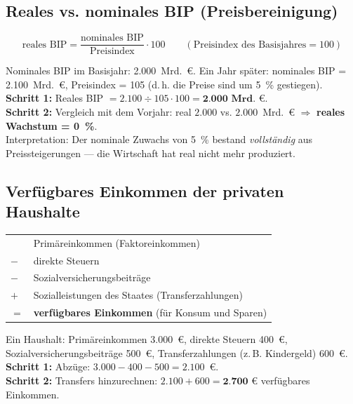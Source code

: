 \documentclass[11pt, a4paper]{article}
\begin{document}
\subsection{Reales vs. nominales BIP (Preisbereinigung)}

\begin{merksatz}[title={\bfseries Formel: reales BIP}]
\[
\text{reales BIP} = \frac{\text{nominales BIP}}{\text{Preisindex}} \cdot 100
\qquad (\text{Preisindex des Basisjahres} = 100)
\]
\end{merksatz}

\begin{beispiel}
Nominales BIP im Basisjahr: 2.000~Mrd.~€. Ein Jahr später: nominales BIP =
2.100~Mrd.~€, Preisindex = 105 (d.\,h. die Preise sind um 5~\% gestiegen).\\[0.3em]
\textbf{Schritt 1:} Reales BIP $= 2.100 \div 105 \cdot 100 = \textbf{2.000~Mrd.~€}$.\\
\textbf{Schritt 2:} Vergleich mit dem Vorjahr: real $2.000$ vs. $2.000$~Mrd.~€
$\Rightarrow$ \textbf{reales Wachstum = 0~\%}.\\[0.3em]
Interpretation: Der nominale Zuwachs von 5~\% bestand \emph{vollständig} aus
Preissteigerungen --- die Wirtschaft hat real nicht mehr produziert.
\end{beispiel}

\subsection{Verfügbares Einkommen der privaten Haushalte}

\begin{merksatz}[title={\bfseries Schema: verfügbares Einkommen}]
\begin{tabular}{ll}
  & Primäreinkommen (Faktoreinkommen)\\
$-$ & direkte Steuern\\
$-$ & Sozialversicherungsbeiträge\\
$+$ & Sozialleistungen des Staates (Transferzahlungen)\\
\midrule
$=$ & \textbf{verfügbares Einkommen} (für Konsum und Sparen)
\end{tabular}
\end{merksatz}

\begin{beispiel}
Ein Haushalt: Primäreinkommen 3.000~€, direkte Steuern 400~€,
Sozialversicherungsbeiträge 500~€, Transferzahlungen (z.\,B. Kindergeld) 600~€.\\[0.3em]
\textbf{Schritt 1:} Abzüge: $3.000 - 400 - 500 = 2.100$~€.\\
\textbf{Schritt 2:} Transfers hinzurechnen: $2.100 + 600 = \textbf{2.700~€}$
verfügbares Einkommen.
\end{beispiel}
\end{document}
